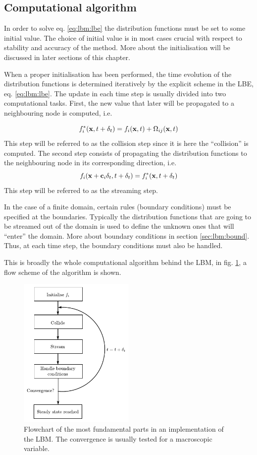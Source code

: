 \subsection{Computational algorithm}
In order to solve eq. \eqref{eq:lbm:lbe} the distribution functions
must be set to some initial value. The choice of initial value is in
most cases crucial with respect to stability and accuracy of the
method. More about the initialisation will be discussed in later
sections of this chapter. 

When a proper initialisation has been performed, the time evolution of
the distribution functions is determined iteratively by the explicit
scheme in the LBE, eq. \eqref{eq:lbm:lbe}. The update in each time
step is usually divided into two computational tasks. First, the new
value that later will be propagated to a neighbouring node is computed,
i.e.

\begin{equation}
f_i^{*}(\mathbf{x}, t + \delta_t) = f_i(\mathbf{x}, t) + \Omega_{ij}(\mathbf{x}, t)
\end{equation}
This step will be referred to as the collision step since it is here
the ``collision'' is computed. The second step consists of propagating
the distribution functions to the neighbouring node in its
corresponding direction, i.e.
\begin{equation}
f_i(\mathbf{x} + \mathbf{c}_i\delta_t, t + \delta_t) = f_i^*(\mathbf{x}, t + \delta_t)
\end{equation}
This step will be referred to as the streaming step.

In the case of a finite domain, certain rules (boundary conditions)
must be specified at the boundaries. Typically the distribution
functions that are going to be streamed out of the domain is used to
define the unknown ones that will ``enter'' the domain. More about
boundary conditions in section \ref{sec:lbm:bound}. Thus, at each time
step, the boundary conditions must also be handled. 

This is broadly the whole computational algorithm behind the LBM, in
fig. \ref{fig:lbm:algo}, a flow scheme of the algorithm is shown.

\begin{figure}
\begin{center}
\includegraphics[width=0.5\textwidth]{fig/algorithm.pdf}
\end{center}
\caption{Flowchart of the most fundamental parts in an implementation
  of the LBM. The convergence is usually tested for a macroscopic
  variable.}
\label{fig:lbm:algo}
\end{figure}
